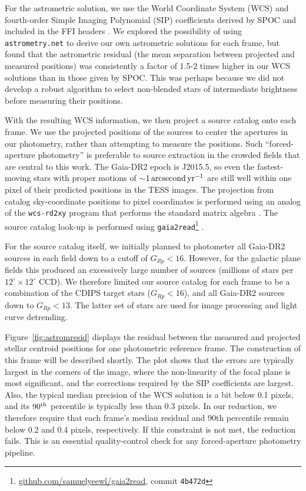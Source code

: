 \documentclass[12pt,twocolumn,tighten,trackchanges]{aastex62}
\begin{document}
For the astrometric solution, we use the World Coordinate System (WCS)
and fourth-order Simple Imaging Polynomial (SIP) coefficients derived
by SPOC and included in the FFI headers
\citep[][Sec.~8]{pence_fits_2010}.  We explored the possibility of
using \texttt{astrometry.net} \citep{lang_2010} to derive our own
astrometric solutions for each frame, but found that the astrometric
residual (the mean separation between projected and measured
positions) was consistently a factor of 1.5-2 times higher in our WCS
solutions than in those given by SPOC.  This was perhaps because we
did not develop a robust algorithm to select non-blended stars of
intermediate brightness before measuring their positions.

With the resulting WCS information, we then project a source catalog
onto each frame.  We use the projected positions of the sources to
center the apertures in our photometry, rather than attempting to
measure the positions.  Such ``forced-aperture photometry'' is
preferable to source extraction in the crowded fields that are central
to this work.  The Gaia-DR2 epoch is J2015.5, so even the
fastest-moving stars with proper motions of $\sim$$1\,{\rm
arcsecond}\,{\rm yr}^{-1}$ are still well within one pixel of their
predicted positions in the TESS images.  The projection from catalog
sky-coordinate positions to pixel coordinates is performed using an
analog of the \texttt{wcs-rd2xy} program that performs the standard
matrix algebra \citep{lang_2010}.  The source catalog look-up is
performed using
\texttt{gaia2read}\footnote{\url{github.com/samuelyeewl/gaia2read}, commit \texttt{4b472d}}
\citep{kim_2018_gaia2read}.

For the source catalog itself, we initially planned to photometer all
Gaia-DR2 sources in each field down to a cutoff of $G_{Rp} < 16$.
However, for the galactic plane fields this produced an excessively
large number of sources (millions of stars per
$12^\circ\times12^\circ$ CCD).  We therefore limited our source
catalog for each frame to be a combination of the CDIPS target stars
($G_{Rp} < 16$), and all Gaia-DR2 sources down to $G_{Rp} < 13$.  The
latter set of stars are used for image processing and light curve
detrending.

Figure~\ref{fig:astromresid} displays the residual between the
measured and projected stellar centroid positions for one photometric
reference frame.  The construction of this frame will be described
shortly.  The plot shows that the errors are typically largest in the
corners of the image, where the non-linearity of the focal plane is
most significant, and the corrections required by the SIP coefficients
are largest.  Also, the typical median precision of the WCS solution
is a bit below 0.1 pixels, and its $90^{\rm th}$ percentile is
typically less than 0.3 pixels.  In our reduction, we therefore
require that each frame's median residual and 90th percentile remain
below 0.2 and 0.4 pixels, respectively. If this constraint is not met,
the reduction fails.  This is an essential quality-control check for
any forced-aperture photometry pipeline.
\end{document}
